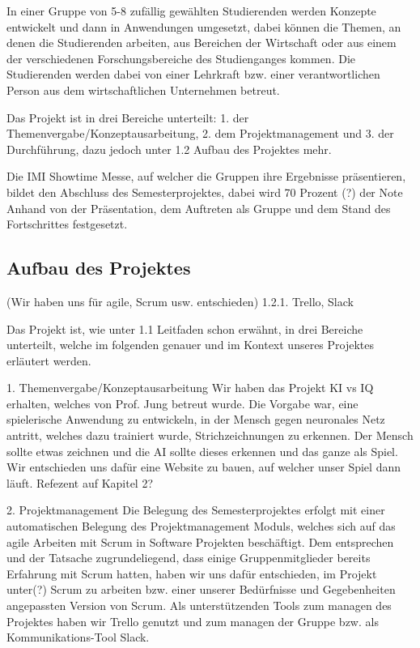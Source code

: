 \documentclass[11pt]{article}
\begin{document}
In einer Gruppe von 5-8 zufällig gewählten Studierenden werden Konzepte entwickelt und dann in Anwendungen umgesetzt, dabei können die Themen, an denen die Studierenden arbeiten, aus Bereichen der Wirtschaft oder aus einem der verschiedenen Forschungsbereiche des Studienganges kommen. 
Die Studierenden werden dabei von einer Lehrkraft bzw. einer verantwortlichen Person aus dem wirtschaftlichen Unternehmen betreut.

Das Projekt ist in drei Bereiche unterteilt: 1. der Themenvergabe/Konzeptausarbeitung, 2. dem Projektmanagement und 3. der Durchführung, dazu jedoch unter 1.2 Aufbau des Projektes mehr.

Die IMI Showtime Messe, auf welcher die Gruppen ihre Ergebnisse präsentieren, bildet den Abschluss des Semesterprojektes, dabei wird 70 Prozent (?) der Note Anhand von der Präsentation, dem Auftreten als Gruppe und dem Stand des Fortschrittes festgesetzt.
\subsection{Aufbau des Projektes}
 (Wir haben uns für agile, Scrum usw. entschieden)    1.2.1. Trello, Slack
    
Das Projekt ist, wie unter 1.1 Leitfaden schon erwähnt, in drei Bereiche unterteilt, welche im folgenden genauer und im Kontext unseres Projektes erläutert werden.

1. Themenvergabe/Konzeptausarbeitung
	Wir haben das Projekt KI vs IQ erhalten, welches von Prof. Jung 		betreut wurde.
	Die Vorgabe war, eine spielerische Anwendung zu entwickeln, 			in der Mensch gegen neuronales Netz antritt, welches dazu 				trainiert wurde, Strichzeichnungen zu erkennen.
	Der Mensch sollte etwas zeichnen und die AI sollte dieses 				erkennen und das ganze als Spiel.
	Wir entschieden uns dafür eine Website zu bauen, auf welcher 			unser Spiel dann läuft.
	Refezent auf Kapitel 2?
	
2. Projektmanagement
	Die Belegung des Semesterprojektes erfolgt mit einer 						automatischen Belegung des Projektmanagement Moduls, 				welches sich auf das agile Arbeiten mit Scrum in Software 				Projekten beschäftigt. Dem entsprechen und der Tatsache 				zugrundeliegend, dass einige Gruppenmitglieder bereits 					Erfahrung mit Scrum hatten, haben wir uns dafür entschieden, im 	Projekt unter(?) Scrum zu arbeiten bzw. einer unserer 						Bedürfnisse und Gegebenheiten angepassten Version von 				Scrum.
	Als unterstützenden Tools zum managen des Projektes haben wir 	Trello genutzt und zum managen der Gruppe bzw. als 						Kommunikations-Tool Slack.
\end{document}
